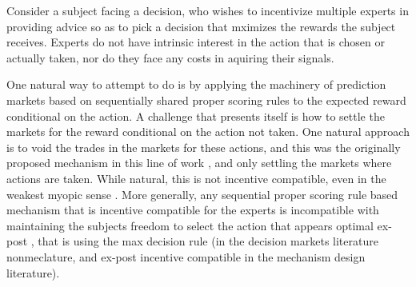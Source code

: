


Consider a subject facing a decision, who wishes to incentivize multiple experts in providing advice so as to pick a decision that mximizes the rewards the subject receives.
Experts do not have intrinsic interest in the action that is chosen or actually taken, nor do they face any costs in aquiring their signals.

One natural way to attempt to do is by applying the machinery of prediction markets based on sequentially shared proper scoring rules to the expected reward conditional on the action. 
A challenge that presents itself is how to settle the markets for the reward conditional on the action not taken.
One natural approach is to void the trades in the markets for these actions, and this was the originally proposed mechanism in this line of work \cite{hanson2002decision}, and only settling the markets where actions are taken.
While natural, this is not incentive compatible, even in the weakest myopic sense \cite{othman2010decision}. 
More generally, any sequential proper scoring rule based mechanism that is incentive compatible for the experts is incompatible with maintaining the subjects freedom to select the action that appears optimal ex-post \cite{othman2010decision,  chen2014eliciting}, that is using the max decision rule (in the decision markets literature nonmeclature, and ex-post incentive compatible in the mechanism design literature). 

